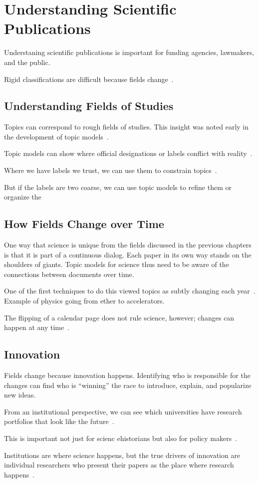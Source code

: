 

\chapter{Understanding Scientific Publications}
\label{ch:sci}

Understaning scientific publications is important for funding
agencies, lawmakers, and the public.

Rigid classifications are difficult because fields
change~\citep{szostak-04}.

\section{Understanding Fields of Studies}

Topics can correspond to rough fields of studies.  This insight was
noted early in the development of topic models~\citep{griffiths-04}.

Topic models can show where official designations or labels conflict
with reality~\citep{talley-11}.

Where we have labels we trust, we can use them to constrain
topics~\citep{ramage-09}.

But if the labels are two coarse, we can use topic models to refine
them or organize the\citep{Nguyen:Boyd-Graber:Resnik:Chang-2014}

\section{How Fields Change over Time}

One way that science is unique from the fields discussed in the
previous chapters is that it is part of a continuous dialog.  Each
paper in its own way stands on the shoulders of giants. Topic models
for science thus need to be aware of the connections between documents
over time.

One of the first techniques to do this viewed topics as subtly
changing each year~\citep{blei-06b}.  Example of physics going from
ether to accelerators.

The flipping of a calendar page does not rule science, however;
changes can happen at any time~\citep{wang-06,wang-08}.

\section{Innovation}

Fields change because innovation happens.  Identifying who is
responsible for the changes can find who is ``winning'' the race to
introduce, explain, and popularize new ideas.

From an institutional perspective, we can see which universities have
research portfolios that look like the future~\citep{ramage-10}.

This is important not just for scienc ehistorians but also for policy
makers~\citep{largent-12}.

Institutions are where science happens, but the true drivers of
innovation are individual researchers who present their papers as the
place where research happens~\citep{gerrish-10}.

